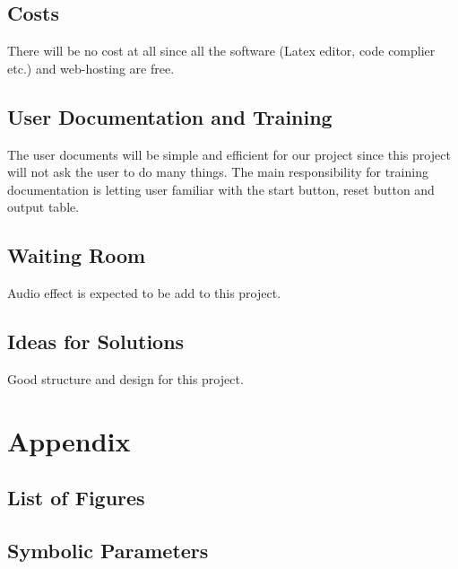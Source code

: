 \documentclass[12pt, titlepage]{article}
\begin{document}
\subsection{Costs}
There will be no cost at all since all the software (Latex editor, code 
complier etc.) and web-hosting are free. 

\subsection{User Documentation and Training}
The user documents will be simple and efficient for our project since this 
project will not ask the user to do many things. The main responsibility for 
training documentation is letting user familiar with the start button, reset 
button and output table.

\subsection{Waiting Room}
Audio effect is expected to be add to this project.

\subsection{Ideas for Solutions}
Good structure and design for this project.






\newpage

\section{Appendix}


\subsection{List of Figures}

\subsection{Symbolic Parameters}
\end{document}
